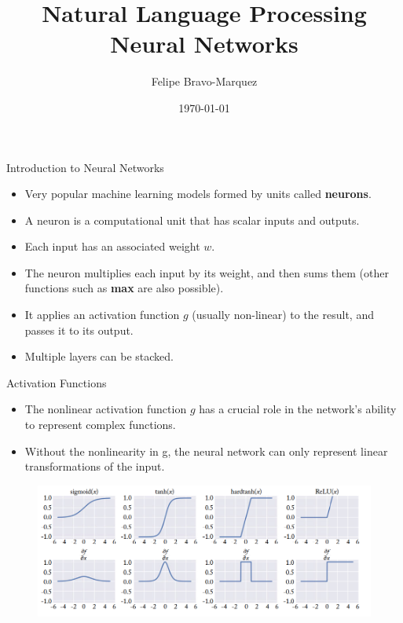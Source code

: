 \documentclass[handout]{beamer}
\title{Natural Language Processing \\ Neural Networks}
\author[Felipe Bravo Márquez]{\footnotesize
 \textcolor[rgb]{0.00,0.00,1.00}{Felipe Bravo-Marquez}}
\date{\today}
\begin{document}
\begin{frame}
\titlepage


\end{frame}





\begin{frame}{Introduction to Neural Networks}
\begin{scriptsize}
\begin{itemize}
\item Very popular machine learning models formed by units called \textbf{neurons}.
\item A neuron is a computational unit that has scalar inputs and outputs. 
\item  Each input has an associated weight $w$.
 \item The neuron multiplies each input by its weight, and then sums them (other functions such as \textbf{max} are also possible). 
\item It applies an activation function $g$ (usually non-linear) to the result, and passes it to its output.
\item Multiple layers can be stacked.
\end{itemize}


\end{scriptsize}
\end{frame}


\begin{frame}{Activation Functions}

\begin{scriptsize}
\begin{itemize}
\item The nonlinear activation function $g$ has a crucial role in the network's ability to represent complex functions. 
\item Without the nonlinearity in g, the neural network can only represent linear transformations of the input.
\end{itemize}


\end{scriptsize}

\begin{figure}[htb]
	\centering
	 \includegraphics[scale=0.24]{pics/activations.png}
\end{figure}


\end{frame}
\end{document}

